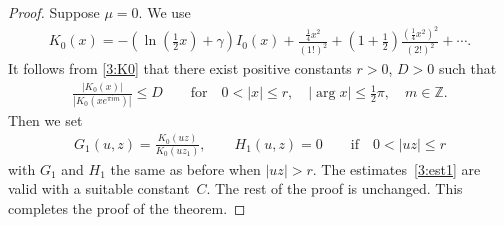 \begin{proof}
Suppose $\mu=0$.
We use \cite[(10.31.2)]{NIST}
\begin{gather}\label{3:K0}
K_0(x)=-\left(\ln\left(\frac12x\right)+\gamma\right)I_0(x)+\frac{\frac14x^2}{(1!)^2}+\left(1+\frac12\right)
\frac{\left(\frac14x^2\right)^2}{\left(2!\right)^2}+\cdots.
\end{gather}
It follows from \eqref{3:K0} that there exist positive constants $r>0$, $D>0$ such that
\begin{gather*}%
\frac{|K_0(x)|}{|K_0(xe^{\pi i m})|}\le D \qquad\text{for} \quad 0<|x|\le r, \quad |\arg x|\le\frac12\pi, \quad m\in\mathbb{Z}.
\end{gather*}
Then we set
\begin{gather*}
G_1(u,z)=\frac{K_0(uz)}{K_0(uz_1)},\qquad H_1(u,z)=0\qquad\text{if} \quad 0<|uz|\le r
\end{gather*}
with $G_1$ and $H_1$ the same as before when $|uz|>r$. The estimates~\eqref{3:est1} are valid with a suitable constant~$C$.
The rest of the proof is unchanged.
This completes the proof of the theorem.
\end{proof}

